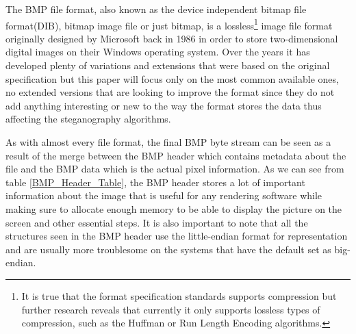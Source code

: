 The BMP file format, also known as the device independent bitmap file format(DIB), bitmap image file or just bitmap, is a lossless\footnote{It is true that the format specification standards supports compression but further research reveals that currently it only supports lossless types of compression, such as the Huffman or Run Length Encoding algorithms.} image file format originally designed by Microsoft back in 1986 in order to store two-dimensional digital images on their Windows operating system. Over the years it has developed plenty of variations and extensions that were based on the original specification but this paper will focus only on the most common available ones, no extended versions that are looking to improve the format since they do not add anything interesting or new to the way the format stores the data thus affecting the steganography algorithms.

As with almost every file format, the final BMP byte stream can be seen as a result of the merge between the BMP header which contains metadata about the file and the BMP data which is the actual pixel information. As we can see from table \ref{BMP_Header_Table}, the BMP header stores a lot of important information about the image that is useful for any rendering software while making sure to allocate enough memory to be able to display the picture on the screen and other essential steps. It is also important to note that all the structures seen in the BMP header use the little-endian format for representation and are usually more troublesome on the systems that have the default set as big-endian.

